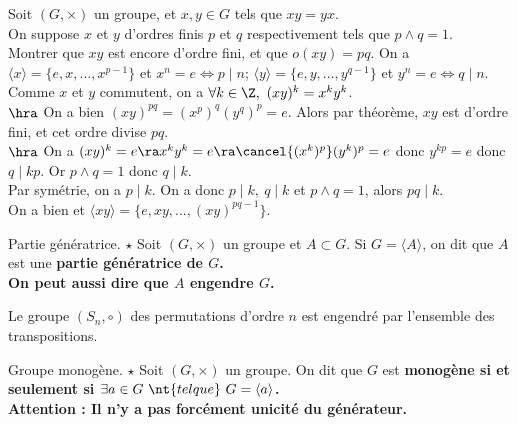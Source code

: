 \documentclass[11pt]{article}
\begin{document}
\begin{ex}{}{}
    Soit $(G,\times)$ un groupe, et $x,y\in G$ tels que $xy=yx$.\\
    On suppose $x$ et $y$ d'ordres finis $p$ et $q$ respectivement tels que $p\land q = 1$.\\
    Montrer que $xy$ est encore d'ordre fini, et que $o(xy)=pq$.
    \tcblower
    On a $\langle x \rangle = \{e,x,...,x^{p-1}\}$ et $x^n=e\iff p\mid n$; $\langle y \rangle = \{e,y,...,y^{q-1}\}$ et $y^n=e\iff q\mid n$.\\
    Comme $x$ et $y$ commutent, on a $\forall k \in \Z, ~ (xy)^k=x^ky^k$.\\
    $\hra$ On a bien $(xy)^{pq}=(x^p)^q(y^q)^p=e$. Alors par théorème, $xy$ est d'ordre fini, et cet ordre divise $pq$.\\
    $\hra$ On a $(xy)^k=e\ra x^ky^k=e \ra \cancel{(x^k)^p}(y^k)^p=e$ donc $y^{kp}=e$ donc $q \mid kp$. Or $p\land q=1$ donc $q\mid k$.\\
    Par symétrie, on a $p\mid k$. On a donc $p\mid k, ~ q \mid k$ et $p\land q=1$, alors $pq\mid k$.\\
    On a bien  et $\langle xy \rangle = \{e,xy,...,(xy)^{pq-1}\}$.
\end{ex}

\vspace*{-0.8cm}

\begin{defi}{Partie génératrice. $\star$}{}
    Soit $(G,\times)$ un groupe et $A\subset G$. Si $G=\langle A \rangle$, on dit que $A$ est une \bf{partie génératrice} de $G$.\\
    On peut aussi dire que $A$ \bf{engendre} $G$.
\end{defi}

\vspace*{-0.8cm}

\begin{ex}{}{}
    Le groupe $(S_n,\circ)$ des permutations d'ordre $n$ est engendré par l'ensemble des transpositions.
\end{ex}

\vspace*{-0.8cm}

\begin{defi}{Groupe monogène. $\star$}{}
    Soit $(G,\times)$ un groupe. On dit que $G$ est \bf{monogène} si et seulement si $\exists a \in G ~\nt{tel que}~ G = \langle a \rangle$.\\
    Attention : Il n'y a pas forcément unicité du générateur.
\end{defi}
\end{document}
